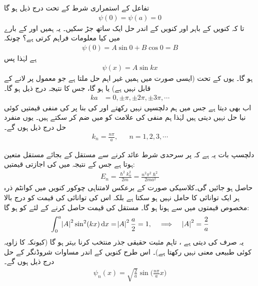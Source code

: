 تفاعل  کے استمراری شرط کے تحت  درج ذیل ہو گا
\begin{align}
\psi(0)=\psi(a)=0
\end{align} 
تا کہ کنویں کے باہر اور کنویں کے اندر حل ایک  ساتھ جڑ سکیں۔ یہ ہمیں اور کے بارے میں کیا معلومات فراہم کرتی ہے؟ چونکہ
\begin{align*}
\psi(0)=A\sin 0+B\cos 0=B
\end{align*}
ہے لہٰذا   پس
\begin{align}
\psi(x)=A\sin kx
\end{align}
ہو گا۔ یوں  کے تحت     (ایسی صورت میں ہمیں غیر اہم حل  ملتا ہے جو معمول پر لانے کے قابل نہیں ہے) یا  ہو گا، جس کا نتیجہ   درج ذیل ہو گا۔
\begin{align}
ka&=0,\pm\pi,\pm2\pi,\pm3\pi,\cdots
\end{align} 
اب  بھی  دیتا ہے جس  میں ہم دلچسپی نہیں رکھتے اور  کی بنا پر  کی منفی قیمتیں کوئی نیا حل نہیں دیتی ہیں لہٰذا ہم منفی کی علامت کو  میں ضم کر سکتے ہیں۔ یوں منفرد حل درج ذیل ہوں گے۔ 
\begin{align}
k_{n}=\frac{n\pi}{a},&& n=1,2,3,\cdots
\end{align}

دلچسپ بات یہ ہے کہ  پر سرحدی شرط عائد کرنے سے  مستقل  کے بجائے مستقل متعین ہوتا ہے جس کے نتیجہ میں    کی اجازتی قیمتیں:
\begin{align}\label{مساوات_شروڈنگر_لامتناہی_چکور_کنواں_توانائیاں}
E_{n}=\frac{\hslash^2 k^{2}_{n}}{2m}=\frac{n^{2}\pi^{2}\hslash^{2}}{2ma^{2}}
\end{align} 
حاصل ہو جائیں گی۔کلاسیکی صورت کے برعکس لامتناہی چوکور کنویں میں کوانٹم ذرہ ہر ایک توانائی کا حامل نہیں ہو سکتا ہے بلکہ اس کی توانائی کی قیمت کو درج بالا مخصوص  قیمتوں میں سے ہونا ہو گا۔ مستقل  کی قیمت حاصل کرنے کے لئے کو  ہو گا: 
\begin{align*}
\int_{0}^{a}\abs{A}^{2}\sin^{2}(kx)\dif{x}=\abs{A}^{2}\frac{a}{2}=1,\quad \implies\quad \abs{A}^{2}=\frac{2}{a}
\end{align*} 
یہ صرف   کی    دیتی ہے ، تاہم مثبت حقیقی جذر  منتخب کرنا بہتر ہو گا (کیونکہ  کا زاویہ کوئی طبیعی معنی نہیں رکھتا ہے)۔ اس طرح کنویں کے اندر مساوات شروڈنگر کے حل درج ذیل ہوں گے۔
\begin{align}\label{مساوات_شروڈنگر_میری_سائے}
\psi_{n}(x)=\sqrt{\frac{2}{a}}\sin\big(\frac{n\pi}{a}x\big)
\end{align}

